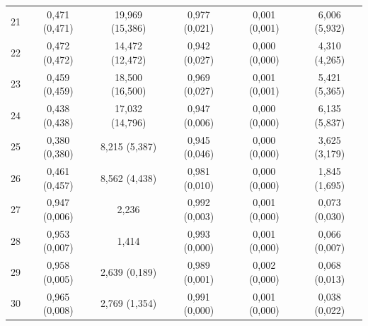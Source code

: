 \begin{tabular}{l c c c c c}
21 & 0,471 (0,471) & 19,969 (15,386) & 0,977 (0,021) & 0,001 (0,001) & 6,006 (5,932) \\
22 & 0,472 (0,472) & 14,472 (12,472) & 0,942 (0,027) & 0,000 (0,000) & 4,310 (4,265) \\
23 & 0,459 (0,459) & 18,500 (16,500) & 0,969 (0,027) & 0,001 (0,001) & 5,421 (5,365) \\
24 & 0,438 (0,438) & 17,032 (14,796) & 0,947 (0,006) & 0,000 (0,000) & 6,135 (5,837) \\
25 & 0,380 (0,380) & 8,215 (5,387) & 0,945 (0,046) & 0,000 (0,000) & 3,625 (3,179) \\
26 & 0,461 (0,457) & 8,562 (4,438) & 0,981 (0,010) & 0,000 (0,000) & 1,845 (1,695) \\
27 & 0,947 (0,006) & 2,236 & 0,992 (0,003) & 0,001 (0,000) & 0,073 (0,030) \\
28 & 0,953 (0,007) & 1,414 & 0,993 (0,000) & 0,001 (0,000) & 0,066 (0,007) \\
29 & 0,958 (0,005) & 2,639 (0,189) & 0,989 (0,001) & 0,002 (0,000) & 0,068 (0,013) \\
30 & 0,965 (0,008) & 2,769 (1,354) & 0,991 (0,000) & 0,001 (0,000) & 0,038 (0,022) \\
\hline 
 \end{tabular}
